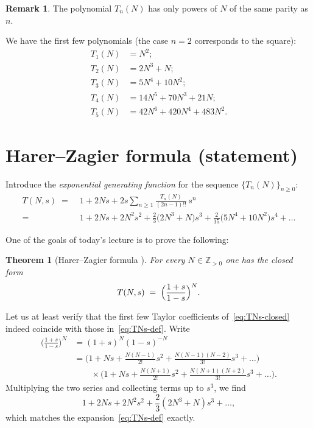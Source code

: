\documentclass[letterpaper,11pt,oneside,reqno]{article}
\numberwithin{equation}{section}
\newtheorem{theorem}[proposition]{Theorem}
\theoremstyle{definition}
\newtheorem{remark}[proposition]{Remark}
\begin{document}
\begin{remark}
The polynomial $T_n(N)$ has only powers of $N$ of the same parity as $n$.
\end{remark}

We have the first few polynomials 
(the case $n=2$ corresponds to the square):
\begin{align*}
	T_1(N)&=N^2;\\
	T_2(N)&=2N^3+N;\\
	T_3(N)&=5N^4+10N^2;\\
	T_4(N)&=14N^5+70N^3+21N;\\
	T_5(N)&=42N^6+420N^4+483N^2.
\end{align*}

\section{Harer–Zagier formula (statement)}


Introduce the \emph{exponential generating function}
for the sequence $\{T_n(N)\}_{n\ge 0}$:
\begin{equation}\label{eq:TNs-def} %
  \begin{split}
    T(N,s)\;=&\;1+2Ns
            +2s\sum_{n\ge 1}\frac{T_n(N)}{(2n-1)!!}\,s^{n}
        \\
       =&\;
        1+2Ns+2N^{2}s^{2}
        +\frac{2}{3}\bigl(2N^{3}+N\bigr)s^{3}
        +\frac{2}{15}\bigl(5N^{4}+10N^{2}\bigr)s^{4}
        +\dots
  \end{split}
\end{equation}

One of the goals of today's lecture is to prove the following:
\begin{theorem}
	[Harer–Zagier formula \cite{harer1986euler}]
	\label{thm:HZ-genfun}
	For every $N\in\mathbb{Z}_{>0}$ one has the closed form
\begin{equation}\label{eq:TNs-closed}
  T(N,s)\;=\;\Bigl(\frac{1+s}{1-s}\Bigr)^{N}.
\end{equation}
\end{theorem}


Let us at least
verify that
the first few Taylor coefficients of~\eqref{eq:TNs-closed}
indeed coincide with those in~\eqref{eq:TNs-def}.
Write
\begin{align*}
  \Biggl(\frac{1+s}{1-s}\Biggr)^N
  &= (1+s)^N (1-s)^{-N} \\
  &=
  \Biggl(1 + Ns + \frac{N(N-1)}{2!}s^2 + \frac{N(N-1)(N-2)}{3!}s^3 + \dots\Biggr) \\
  &\qquad\times
  \Biggl(1 + Ns + \frac{N(N+1)}{2!}s^2 + \frac{N(N+1)(N+2)}{3!}s^3 + \dots\Biggr).
\end{align*}
Multiplying the two series and collecting terms up to $s^3$, we find
\[
  1 + 2N s + 2N^2 s^2 + \frac{2}{3}(2N^3 + N) s^3 + \dots,
\]
which matches the expansion~\eqref{eq:TNs-def} exactly.
\end{document}
